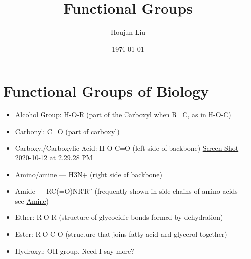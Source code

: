 \documentclass[letterpaper]{article}
\author{Houjun Liu}
\date{\today}
\title{Functional Groups}
\renewcommand\maketitle{}
\begin{document}
\maketitle


\section{Functional Groups of Biology}
\label{sec:orga4d2aef}
\begin{itemize}
\item Alcohol Group: H-O-R (part of the Carboxyl when R=C, as in H-O-C)
\item Carbonyl: C=O (part of carboxyl)
\item Carboxyl/Carboxylic Acid: H-O-C=O (left side of backbone)
\href{Screen Shot 2020-10-12 at 2.29.28 PM.org}{Screen Shot
2020-10-12 at 2.29.28 PM}
\item Amino/amine --- H3N+ (right side of backbone)
\item Amide --- RC(=O)NR′R″ (frequently shown in side chains of amino acids
--- see
\href{https://en.wikipedia.org/wiki/Amide\#/media/File:Amide-general.png}{Amine})
\item Ether: R-O-R (structure of glycocidic bonds formed by dehydration)
\item Ester: R-O-C-O (structure that joins fatty acid and glycerol together)
\item Hydroxyl: OH group. Need I say more?
\end{itemize}
\end{document}
